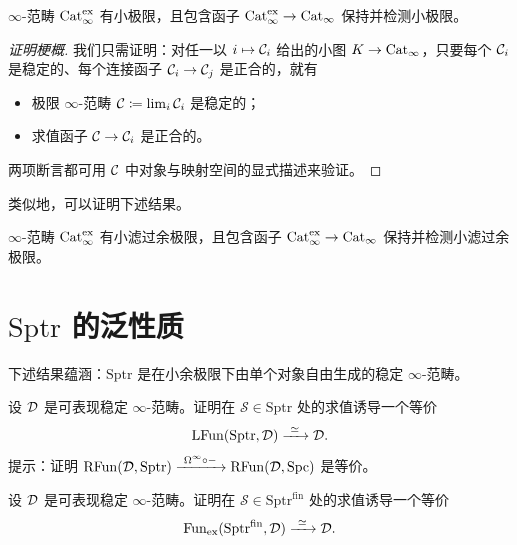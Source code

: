 \begin{theorem}\label{L15-5.8}
$\infty$-范畴 $\operatorname{Cat}_{\infty}^{\mathrm{ex}}$ 有小极限，且包含函子 $\operatorname{Cat}_{\infty}^{\mathrm{ex}}\to\operatorname{Cat}_{\infty}$ 保持并检测小极限。
\end{theorem}

\begin{proof}[证明梗概]
我们只需证明：对任一以 $i\mapsto\mathcal{C}_{i}$ 给出的小图 $K\to\operatorname{Cat}_{\infty}$，只要每个 $\mathcal{C}_{i}$ 是稳定的、每个连接函子 $\mathcal{C}_{i}\to\mathcal{C}_{j}$ 是正合的，就有
\begin{itemize}[leftmargin=2.2em,itemsep=0.1em]
\item 极限 $\infty$-范畴 $\mathcal{C}\coloneqq\lim_{i}\mathcal{C}_{i}$ 是稳定的；
\item 求值函子 $\mathcal{C}\to\mathcal{C}_{i}$ 是正合的。
\end{itemize}
两项断言都可用 $\mathcal{C}$ 中对象与映射空间的显式描述来验证。
\end{proof}

\nitem\label{L15-5.9} 类似地，可以证明下述结果。

\begin{theorem}\label{L15-5.10}
$\infty$-范畴 $\operatorname{Cat}_{\infty}^{\mathrm{ex}}$ 有小滤过余极限，且包含函子 $\operatorname{Cat}_{\infty}^{\mathrm{ex}}\to\operatorname{Cat}_{\infty}$ 保持并检测小滤过余极限。
\end{theorem}

\section{$\mathrm{Sptr}$ 的泛性质}

\nitem\label{L15-6.1} 下述结果蕴涵：$\mathrm{Sptr}$ 是在小余极限下由单个对象自由生成的稳定 $\infty$-范畴。

\begin{exercise}\label{L15-6.2}
设 $\mathcal{D}$ 是可表现稳定 $\infty$-范畴。证明在 $\mathcal{S}\in\mathrm{Sptr}$ 处的求值诱导一个等价
\[
\mathrm{LFun}(\mathrm{Sptr},\cD)\xrightarrow{\ \simeq\ }\cD.
\]
提示：证明 $\mathrm{RFun}(\cD,\mathrm{Sptr})\xrightarrow{\ \Omega^{\infty}\circ-\ }\mathrm{RFun}(\cD,\Spc)$ 是等价。
\end{exercise}

\begin{exercise}\label{L15-6.3}
设 $\mathcal{D}$ 是可表现稳定 $\infty$-范畴。证明在 $\mathcal{S}\in\mathrm{Sptr}^{\mathrm{fin}}$ 处的求值诱导一个等价
\[
\Fun_{\mathrm{ex}}(\mathrm{Sptr}^{\mathrm{fin}},\cD)\xrightarrow{\ \simeq\ }\cD.
\]
\end{exercise}


